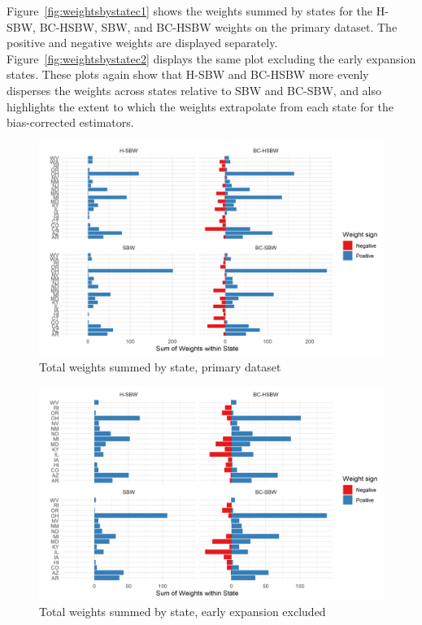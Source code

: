 Figure~\ref{fig:weightsbystatec1} shows the weights summed by states for the H-SBW, BC-HSBW, SBW, and BC-HSBW weights on the primary dataset. The positive and negative weights are displayed separately. Figure~\ref{fig:weightsbystatec2} displays the same plot excluding the early expansion states. These plots again show that H-SBW and BC-HSBW more evenly disperses the weights across states relative to SBW and BC-SBW, and also highlights the extent to which the weights extrapolate from each state for the bias-corrected estimators.

\begin{figure}[H]
\begin{center}
    \caption{Total weights summed by state, primary dataset}
    \label{fig:weightsbystatec1all}
    \includegraphics[scale=0.5]{01_Plots/weights-by-state-c1-all.png}
\end{center}
\end{figure}

\begin{figure}[H]
\begin{center}
    \caption{Total weights summed by state, early expansion excluded}
    \label{fig:weightsbystatec2all}
    \includegraphics[scale=0.5]{01_Plots/weights-by-state-c2-all.png}
\end{center}
\end{figure}


